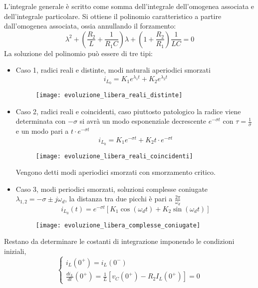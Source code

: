 L'integrale generale è scritto come somma dell'integrale dell'omogenea associata e dell'integrale particolare.
Si ottiene il polinomio caratteristico a partire dall'omogenea associata, ossia annullando il forzamento:
\begin{equation}
\lambda^2 + \left(\frac{R_2}{L} + \frac{1}{R_1 C}\right)\lambda + \left(1+\frac{R_2}{R_1}\right)\frac{1}{LC} = 0
\end{equation}
La soluzione del polinomio può essere di tre tipi:

\begin{itemize}
\item Caso 1, radici reali e distinte, modi naturali aperiodici smorzati
$$
i_{L_0} = K_1 e^{\lambda_1 t} + K_2 e^{\lambda_2 t}
$$
\begin{figure}[H]
\centering
\texttt{[image: evoluzione\_libera\_reali\_distinte]}
\end{figure}


\item Caso 2, radici reali e coincidenti, caso piuttosto patologico
la radice viene determinata con $-\sigma$ si avrà un modo esponenziale decrescente $e^{-\sigma t} $ con
$\tau = \frac{1}{\sigma}$ e un modo pari a  $t\cdot e^{-\sigma t}$
$$
i_{L_0} = K_1 e^{-\sigma t} + K_2 t\cdot e^{-\sigma t}
$$
\begin{figure}[H]
\centering
\texttt{[image: evoluzione\_libera\_reali\_coincidenti]}
\end{figure}
Vengono detti modi aperiodici smorzati con smorzamento critico.


\item Caso 3, modi periodici smorzati, soluzioni complesse coniugate
$\lambda_{1,2} = -\sigma \pm j\omega_d$, la distanza tra due picchi è pari a $\frac{2\pi}{\omega_d}$
$$i_{L_0}(t) = e^{-\sigma t} [K_1 \cos (\omega_d t) + K_2 \sin(\omega_d t)]$$
\begin{figure}[H]
\centering
\texttt{[image: evoluzione\_libera\_complesse\_coniugate]}
\end{figure}
\end{itemize}

Restano da determinare le costanti di integrazione imponendo le condizioni iniziali,
\begin{equation*}
\begin{cases}
i_L(0^+) = i_L(0^-) \\
\frac{di_L}{dt}(0^+) = \frac{1}{L}[v_C(0^+) - R_2I_L(0^+)] = 0
\end{cases}
\end{equation*}
